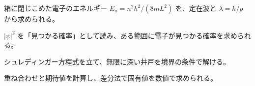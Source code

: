 \begin{furikaeri}
\begin{checklist}
\item 箱に閉じこめた電子のエネルギー $E_n=n^2h^2/(8mL^2)$ を、定在波と $\lambda=h/p$ から求められる。
\item $|\psi|^2$ を「見つかる確率」として読み、ある範囲に電子が見つかる確率を求められる。
\item シュレディンガー方程式を立て、無限に深い井戸を境界の条件で解ける。
\item 重ね合わせと期待値を計算し、差分法で固有値を数値で求められる。
\end{checklist}
\end{furikaeri}
